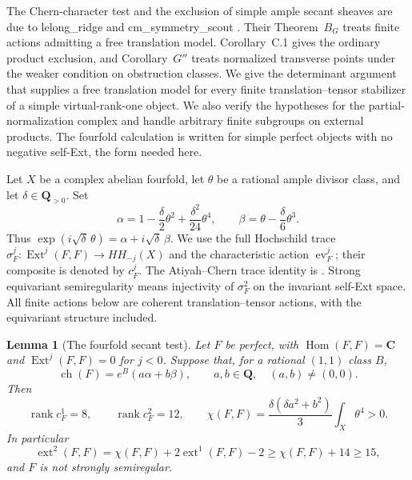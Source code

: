 \documentclass[11pt]{article}
\newtheorem{lemma}[theorem]{Lemma}
\theoremstyle{definition}
\theoremstyle{remark}
\newcommand{\Q}{\mathbf Q}
\newcommand{\C}{\mathbf C}
\begin{document}
The Chern-character test and the exclusion of simple ample secant sheaves
are due to lelong\_ridge and cm\_symmetry\_scout
\cite[Theorems~A--C, \S\S1, 3--4]{SecantCharacterTest}.
Their Theorem~$B_G$ treats finite actions admitting a free translation
model. Corollary~C.1 gives the ordinary product exclusion, and
Corollary~$G''$ treats normalized transverse points under the weaker
condition on obstruction classes. We give the determinant argument
that supplies a free translation model
for every finite translation--tensor stabilizer of a simple
virtual-rank-one object. We also verify the hypotheses for the
partial-normalization complex and handle arbitrary finite subgroups
on external products. The fourfold calculation is written for
simple perfect objects with no negative self-Ext, the form needed here.

Let $X$ be a complex abelian fourfold, let $\theta$ be a rational ample
divisor class, and let $\delta\in\Q_{>0}$.  Set
\begin{equation}\label{eq:fourfold-secant-basis}
 \alpha=1-\frac{\delta}{2}\theta^2+
                      \frac{\delta^2}{24}\theta^4,
 \qquad
 \beta=\theta-\frac{\delta}{6}\theta^3.
\end{equation}
Thus $\exp(i\sqrt\delta\,\theta)=\alpha+i\sqrt\delta\,\beta$.
We use the full Hochschild trace
$\sigma_F^j:\operatorname{Ext}^j(F,F)\to HH_{-j}(X)$ and the
characteristic action $\operatorname{ev}_F^j$; their composite is denoted
by $c_F^j$.  The Atiyah--Chern trace identity is
\cite[Proposition~6.2.1, Corollary~6.3.2 and Theorem~6.4.2]{BFHH}.
Strong equivariant semiregularity means injectivity of $\sigma_F^2$ on
the invariant self-Ext space.  All finite actions below are coherent
translation--tensor actions, with the equivariant structure included.

\begin{lemma}[The fourfold secant test]\label{lem:fourfold-secant-test}
Let $F$ be perfect, with
$\operatorname{Hom}(F,F)=\C$ and
$\operatorname{Ext}^j(F,F)=0$ for $j<0$.  Suppose that, for a rational
$(1,1)$ class $B$,
\[
 \operatorname{ch}(F)=e^B(a\alpha+b\beta),
 \qquad a,b\in\Q,\quad (a,b)\ne(0,0).
\]
Then
\begin{equation}\label{eq:fourfold-secant-ranks-euler}
 \operatorname{rank}c_F^1=8,\qquad
 \operatorname{rank}c_F^2=12,\qquad
 \chi(F,F)=\frac{\delta(\delta a^2+b^2)}3
                                     \int_X\theta^4>0.
\end{equation}
In particular
\[
 \operatorname{ext}^2(F,F)
   =\chi(F,F)+2\operatorname{ext}^1(F,F)-2
   \ge\chi(F,F)+14\ge15,
\]
and $F$ is not strongly semiregular.
\end{lemma}
\end{document}
